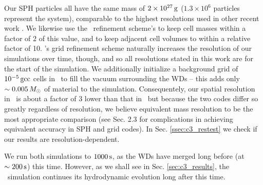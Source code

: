 Our SPH particles all have the same mass of $2\times10^{27}\,\mathrm{g}$ ($1.3\times10^{6}$ particles represent the system), comparable to the highest resolutions used in other recent work \citep{pakm+12, rask+14}.  We likewise use the \arepo\ refinement scheme's to keep cell masses within a factor of $2$ of this value, and to keep adjacent cell volumes to within a relative factor of 10.  \arepo's grid refinement scheme naturally increases the resolution of our simulations over time, though, and so all resolutions stated in this work are for the start of the simulation.  We additionally initialize a background grid of $10^{-5}\,\mathrm{gcc}$ cells in \arepo\ to fill the vacuum surrounding the WDs -- this adds only $\sim0.005\,\Msun$ of material to the simulation.  Consequentely, our spatial resolution in \gasoline\ is about a factor of {\charles $3$} lower than that in \arepo\, but because the two codes differ so greatly regardless of resolution, we believe equivalent mass resolution to be the most appropriate comparison (see \citeauthor{voge+12} Sec. 2.3 for complications in achieving equivalent accuracy in SPH and grid codes).  In Sec. \ref{ssec:c3_restest} we check if our results are resolution-dependent.

We run both simulations to $1000\,\mathrm{s}$, as the WDs have merged long before (at $\sim200\,\mathrm{s}$) this time.  However, as we shall see in Sec. \ref{sec:c3_results}, the \arepo\ simulation continues its hydrodynamic evolution long after this time.



